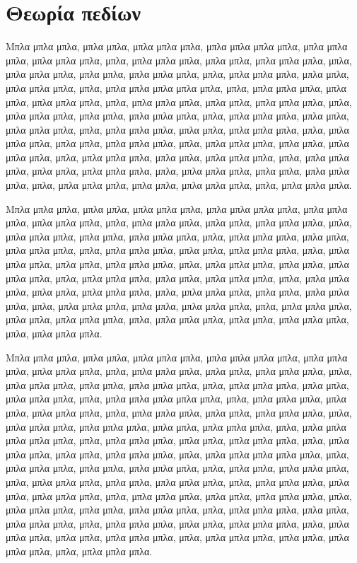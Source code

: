 \documentclass[diploma]{softlab-thesis}
\begin{document}
\section{Θεωρία πεδίων}

Μπλα μπλα μπλα, μπλα μπλα, μπλα μπλα μπλα, μπλα μπλα μπλα μπλα,
μπλα μπλα μπλα, μπλα μπλα μπλα, μπλα, μπλα μπλα μπλα, μπλα μπλα,
μπλα μπλα μπλα, μπλα, μπλα μπλα μπλα, μπλα μπλα, μπλα μπλα μπλα,
μπλα, μπλα μπλα μπλα, μπλα μπλα, μπλα μπλα μπλα, μπλα, μπλα μπλα
μπλα μπλα μπλα, μπλα, μπλα μπλα μπλα, μπλα μπλα, μπλα μπλα μπλα,
μπλα, μπλα μπλα μπλα, μπλα μπλα, μπλα μπλα μπλα, μπλα, μπλα μπλα
μπλα, μπλα μπλα, μπλα μπλα μπλα, μπλα, μπλα μπλα μπλα, μπλα μπλα,
μπλα μπλα μπλα, μπλα, μπλα μπλα μπλα, μπλα μπλα, μπλα μπλα μπλα,
μπλα, μπλα μπλα μπλα, μπλα μπλα, μπλα μπλα μπλα, μπλα, μπλα μπλα
μπλα, μπλα μπλα, μπλα μπλα μπλα, μπλα, μπλα μπλα μπλα, μπλα μπλα,
μπλα μπλα μπλα, μπλα, μπλα μπλα μπλα, μπλα μπλα, μπλα μπλα μπλα,
μπλα, μπλα μπλα μπλα, μπλα μπλα, μπλα μπλα μπλα, μπλα, μπλα μπλα
μπλα, μπλα μπλα, μπλα μπλα μπλα, μπλα, μπλα μπλα μπλα.

Μπλα μπλα μπλα, μπλα μπλα, μπλα μπλα μπλα, μπλα μπλα μπλα μπλα,
μπλα μπλα μπλα, μπλα μπλα μπλα, μπλα, μπλα μπλα μπλα, μπλα μπλα,
μπλα μπλα μπλα, μπλα, μπλα μπλα μπλα, μπλα μπλα, μπλα μπλα μπλα,
μπλα, μπλα μπλα μπλα, μπλα μπλα, μπλα μπλα μπλα, μπλα, μπλα μπλα
μπλα, μπλα μπλα, μπλα μπλα μπλα, μπλα, μπλα μπλα μπλα, μπλα μπλα,
μπλα μπλα μπλα, μπλα, μπλα μπλα μπλα, μπλα μπλα, μπλα μπλα μπλα,
μπλα, μπλα μπλα μπλα, μπλα μπλα, μπλα μπλα μπλα, μπλα, μπλα μπλα
μπλα, μπλα μπλα, μπλα μπλα μπλα, μπλα, μπλα μπλα μπλα, μπλα μπλα,
μπλα μπλα μπλα, μπλα, μπλα μπλα μπλα, μπλα μπλα, μπλα μπλα μπλα,
μπλα, μπλα μπλα μπλα, μπλα μπλα, μπλα μπλα μπλα, μπλα, μπλα μπλα
μπλα, μπλα μπλα, μπλα μπλα μπλα, μπλα, μπλα μπλα μπλα.

Μπλα μπλα μπλα, μπλα μπλα, μπλα μπλα μπλα, μπλα μπλα μπλα μπλα,
μπλα μπλα μπλα, μπλα μπλα μπλα, μπλα, μπλα μπλα μπλα, μπλα μπλα,
μπλα μπλα μπλα, μπλα, μπλα μπλα μπλα, μπλα μπλα, μπλα μπλα μπλα,
μπλα, μπλα μπλα μπλα, μπλα μπλα, μπλα μπλα μπλα, μπλα, μπλα μπλα
μπλα μπλα μπλα, μπλα, μπλα μπλα μπλα, μπλα μπλα, μπλα μπλα μπλα,
μπλα, μπλα μπλα μπλα, μπλα μπλα, μπλα μπλα μπλα, μπλα, μπλα μπλα
μπλα, μπλα μπλα μπλα, μπλα μπλα, μπλα μπλα μπλα, μπλα, μπλα μπλα
μπλα μπλα μπλα, μπλα, μπλα μπλα μπλα, μπλα μπλα, μπλα μπλα μπλα,
μπλα, μπλα μπλα μπλα, μπλα μπλα, μπλα μπλα μπλα, μπλα, μπλα μπλα
μπλα μπλα μπλα, μπλα, μπλα μπλα μπλα, μπλα μπλα, μπλα μπλα μπλα,
μπλα, μπλα μπλα, μπλα μπλα μπλα, μπλα, μπλα μπλα μπλα, μπλα μπλα,
μπλα μπλα μπλα, μπλα, μπλα μπλα μπλα, μπλα μπλα, μπλα μπλα μπλα,
μπλα, μπλα μπλα μπλα, μπλα μπλα, μπλα μπλα μπλα, μπλα, μπλα μπλα
μπλα, μπλα μπλα, μπλα μπλα μπλα, μπλα, μπλα μπλα μπλα, μπλα μπλα,
μπλα μπλα μπλα, μπλα, μπλα μπλα μπλα, μπλα μπλα, μπλα μπλα μπλα,
μπλα, μπλα μπλα μπλα, μπλα μπλα, μπλα μπλα μπλα, μπλα, μπλα μπλα
μπλα, μπλα μπλα, μπλα μπλα μπλα, μπλα, μπλα μπλα μπλα.
\end{document}
